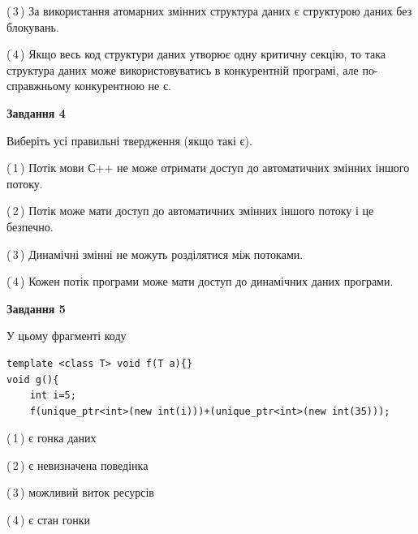 \documentclass[12pt, ukrainian]{article}
\begin{document}
\begin {large}
{(\,3\,) За використання атомарних змінних структура даних є структурою даних без блокувань.%

(\,4\,) Якщо весь код структури даних утворює одну критичну секцію, то така структура даних може використовуватись в конкурентній програмі, але по-справжньо\-му конкурентною не є.%



\begin{center}
\textbf{Завдання 4}
\end{center}
Виберіть усі правильні твердження (якщо такі є).\par
\vspace{2mm}

(\,1\,) Потік мови С++ не може отримати доступ до автоматичних змінних іншого потоку.%

(\,2\,) Потік може мати доступ до автоматичних змінних іншого потоку і це безпечно.%

(\,3\,) Динамічні змінні не можуть розділятися між потоками.%

(\,4\,) Кожен потік програми може мати доступ до динамічних даних програми.%



\begin{center}
\textbf{Завдання 5}
\end{center}
У цьому фрагменті коду
\begin{verbatim}
template <class T> void f(T a){}
void g(){
    int i=5;
    f(unique_ptr<int>(new int(i)))+(unique_ptr<int>(new int(35)));
\end{verbatim}
(\,1\,) є гонка даних%

(\,2\,) є невизначена поведінка%

(\,3\,) можливий виток ресурсів%

(\,4\,) є стан гонки%


}
\end {large}
\end{document}
